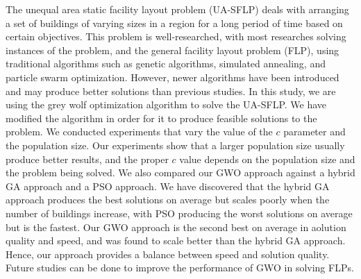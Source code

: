 
The unequal area static facility layout problem (UA-SFLP) deals with arranging a set of buildings of varying sizes in a region for a long period of time based on certain objectives. This problem is well-researched, with most researches solving instances of the problem, and the general facility layout problem (FLP), using traditional algorithms such as genetic algorithms, simulated annealing, and particle swarm optimization. However, newer algorithms have been introduced and may produce better solutions than previous studies. In this study, we are using the grey wolf optimization algorithm to solve the UA-SFLP. We have modified the algorithm in order for it to produce feasible solutions to the problem. We conducted experiments that vary the value of the $c$ parameter and the population size. Our experiments show that a larger population size usually produce better results, and the proper $c$ value depends on the population size and the problem being solved. We also compared our GWO approach against a hybrid GA approach and a PSO approach. We have discovered that the hybrid GA approach produces the best solutions on average but scales poorly when the number of buildings increase, with PSO producing the worst solutions on average but is the fastest. Our GWO approach is the second best on average in aolution quality and speed, and was found to scale better than the hybrid GA approach. Hence, our approach provides a balance between speed and solution quality. Future studies can be done to improve the performance of GWO in solving FLPs.